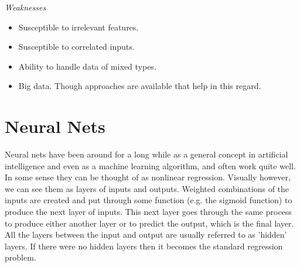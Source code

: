 \documentclass[english,nohyper,titlepage]{tufte-handout}\usepackage{knitr}
\begin{document}
\noindent\emph{Weaknesses}
\begin{itemize}
  \item Susceptible to irrelevant features.
  \item Susceptible to correlated inputs.
  \item Ability to handle data of mixed types.
  \item Big data. Though approaches are available that help in this regard.
\end{itemize}

\section{Neural Nets}
Neural nets have been around for a long while as a general concept in artificial intelligence and even as a machine learning algorithm, and often work quite well.  In some sense they can be thought of as nonlinear regression.  Visually however, we can see them as layers of inputs and outputs.  Weighted combinations of the inputs are created and put through some function (e.g. the sigmoid function) to produce the next layer of inputs. This next layer goes through the same process to produce either another layer or to predict the output, which is the final layer.  All the layers between the input and output are usually referred to as 'hidden' layers. If there were no hidden layers then it becomes the standard regression problem.
\end{document}
